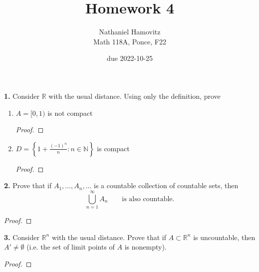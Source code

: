 \documentclass{article}
\newcommand{\R}{\mathbb{R}}
\newcommand{\N}{\mathbb{N}}
\newcommand{\set}[1]{\left\{ #1 \right\}}
\begin{document}
\renewcommand{\labelenumi}{(\alph{enumi})}


\title{Homework 4} %
\author{Nathaniel Hamovitz\\Math 118A, Ponce, F22}
\date{due 2022-10-25}

\maketitle

\textbf{1. }
Consider $\R$ with the usual distance. Using only the definition, prove

\begin{enumerate}
    \item 
    $A = [0, 1)$ is not compact
    \begin{proof}
        
    \end{proof}


    \item 
    $D = \set{1 + \frac{(-1)^{n}}{n} : n \in \N}$ is compact
    \begin{proof}
        
    \end{proof}
\end{enumerate}


\newpage %


\textbf{2. }
Prove that if $A_1, \dots, A_n, \dots$ is a countable collection of countable sets, then
$$\bigcup_{n = 1}^{\infty} A_n \qquad \text{is also countable.}$$

\begin{proof}
    
\end{proof}


\newpage %


\textbf{3. }
Consider $\R^n$ with the usual distance. Prove that if $A \subset
\R^n$ is uncountable, then $A' \ne \emptyset$ (i.e. the set of limit points of $A$ is nonempty).

\begin{proof}

\end{proof}
\end{document}
